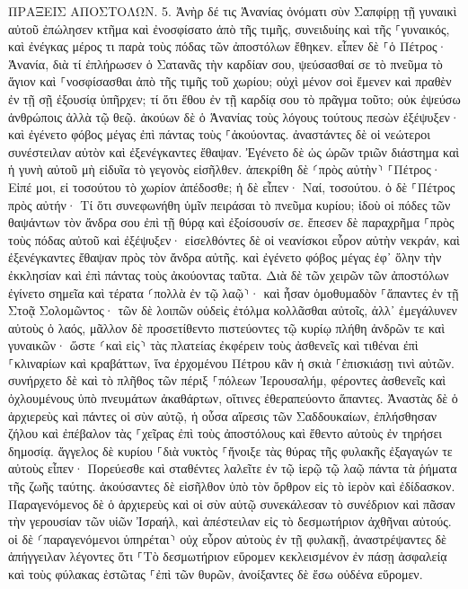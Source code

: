 \documentclass[twoside, 9pt]{extreport}
\begin{document}
ΠΡΑΞΕΙΣ ΑΠΟΣΤΟΛΩΝ.
5.
Ἀνὴρ δέ τις Ἁνανίας ὀνόματι σὺν Σαπφίρῃ τῇ γυναικὶ αὐτοῦ ἐπώλησεν κτῆμα 
καὶ ἐνοσφίσατο ἀπὸ τῆς τιμῆς, συνειδυίης καὶ τῆς ⸀γυναικός, καὶ ἐνέγκας μέρος τι παρὰ τοὺς πόδας τῶν ἀποστόλων ἔθηκεν. 
εἶπεν δὲ ⸀ὁ Πέτρος· Ἁνανία, διὰ τί ἐπλήρωσεν ὁ Σατανᾶς τὴν καρδίαν σου, ψεύσασθαί σε τὸ πνεῦμα τὸ ἅγιον καὶ ⸀νοσφίσασθαι ἀπὸ τῆς τιμῆς τοῦ χωρίου; 
οὐχὶ μένον σοὶ ἔμενεν καὶ πραθὲν ἐν τῇ σῇ ἐξουσίᾳ ὑπῆρχεν; τί ὅτι ἔθου ἐν τῇ καρδίᾳ σου τὸ πρᾶγμα τοῦτο; οὐκ ἐψεύσω ἀνθρώποις ἀλλὰ τῷ θεῷ. 
ἀκούων δὲ ὁ Ἁνανίας τοὺς λόγους τούτους πεσὼν ἐξέψυξεν· καὶ ἐγένετο φόβος μέγας ἐπὶ πάντας τοὺς ⸀ἀκούοντας. 
ἀναστάντες δὲ οἱ νεώτεροι συνέστειλαν αὐτὸν καὶ ἐξενέγκαντες ἔθαψαν. 
Ἐγένετο δὲ ὡς ὡρῶν τριῶν διάστημα καὶ ἡ γυνὴ αὐτοῦ μὴ εἰδυῖα τὸ γεγονὸς εἰσῆλθεν. 
ἀπεκρίθη δὲ ⸂πρὸς αὐτὴν⸃ ⸀Πέτρος· Εἰπέ μοι, εἰ τοσούτου τὸ χωρίον ἀπέδοσθε; ἡ δὲ εἶπεν· Ναί, τοσούτου. 
ὁ δὲ ⸀Πέτρος πρὸς αὐτήν· Τί ὅτι συνεφωνήθη ὑμῖν πειράσαι τὸ πνεῦμα κυρίου; ἰδοὺ οἱ πόδες τῶν θαψάντων τὸν ἄνδρα σου ἐπὶ τῇ θύρᾳ καὶ ἐξοίσουσίν σε. 
ἔπεσεν δὲ παραχρῆμα ⸀πρὸς τοὺς πόδας αὐτοῦ καὶ ἐξέψυξεν· εἰσελθόντες δὲ οἱ νεανίσκοι εὗρον αὐτὴν νεκράν, καὶ ἐξενέγκαντες ἔθαψαν πρὸς τὸν ἄνδρα αὐτῆς. 
καὶ ἐγένετο φόβος μέγας ἐφ᾽ ὅλην τὴν ἐκκλησίαν καὶ ἐπὶ πάντας τοὺς ἀκούοντας ταῦτα. 
Διὰ δὲ τῶν χειρῶν τῶν ἀποστόλων ἐγίνετο σημεῖα καὶ τέρατα ⸂πολλὰ ἐν τῷ λαῷ⸃· καὶ ἦσαν ὁμοθυμαδὸν ⸀ἅπαντες ἐν τῇ Στοᾷ Σολομῶντος· 
τῶν δὲ λοιπῶν οὐδεὶς ἐτόλμα κολλᾶσθαι αὐτοῖς, ἀλλ᾽ ἐμεγάλυνεν αὐτοὺς ὁ λαός, 
μᾶλλον δὲ προσετίθεντο πιστεύοντες τῷ κυρίῳ πλήθη ἀνδρῶν τε καὶ γυναικῶν· 
ὥστε ⸂καὶ εἰς⸃ τὰς πλατείας ἐκφέρειν τοὺς ἀσθενεῖς καὶ τιθέναι ἐπὶ ⸀κλιναρίων καὶ κραβάττων, ἵνα ἐρχομένου Πέτρου κἂν ἡ σκιὰ ⸀ἐπισκιάσῃ τινὶ αὐτῶν. 
συνήρχετο δὲ καὶ τὸ πλῆθος τῶν πέριξ ⸀πόλεων Ἰερουσαλήμ, φέροντες ἀσθενεῖς καὶ ὀχλουμένους ὑπὸ πνευμάτων ἀκαθάρτων, οἵτινες ἐθεραπεύοντο ἅπαντες. 
Ἀναστὰς δὲ ὁ ἀρχιερεὺς καὶ πάντες οἱ σὺν αὐτῷ, ἡ οὖσα αἵρεσις τῶν Σαδδουκαίων, ἐπλήσθησαν ζήλου 
καὶ ἐπέβαλον τὰς ⸀χεῖρας ἐπὶ τοὺς ἀποστόλους καὶ ἔθεντο αὐτοὺς ἐν τηρήσει δημοσίᾳ. 
ἄγγελος δὲ κυρίου ⸀διὰ νυκτὸς ⸀ἤνοιξε τὰς θύρας τῆς φυλακῆς ἐξαγαγών τε αὐτοὺς εἶπεν· 
Πορεύεσθε καὶ σταθέντες λαλεῖτε ἐν τῷ ἱερῷ τῷ λαῷ πάντα τὰ ῥήματα τῆς ζωῆς ταύτης. 
ἀκούσαντες δὲ εἰσῆλθον ὑπὸ τὸν ὄρθρον εἰς τὸ ἱερὸν καὶ ἐδίδασκον. Παραγενόμενος δὲ ὁ ἀρχιερεὺς καὶ οἱ σὺν αὐτῷ συνεκάλεσαν τὸ συνέδριον καὶ πᾶσαν τὴν γερουσίαν τῶν υἱῶν Ἰσραήλ, καὶ ἀπέστειλαν εἰς τὸ δεσμωτήριον ἀχθῆναι αὐτούς. 
οἱ δὲ ⸂παραγενόμενοι ὑπηρέται⸃ οὐχ εὗρον αὐτοὺς ἐν τῇ φυλακῇ, ἀναστρέψαντες δὲ ἀπήγγειλαν 
λέγοντες ὅτι ⸀Τὸ δεσμωτήριον εὕρομεν κεκλεισμένον ἐν πάσῃ ἀσφαλείᾳ καὶ τοὺς φύλακας ἑστῶτας ⸀ἐπὶ τῶν θυρῶν, ἀνοίξαντες δὲ ἔσω οὐδένα εὕρομεν. 
\end{document}
